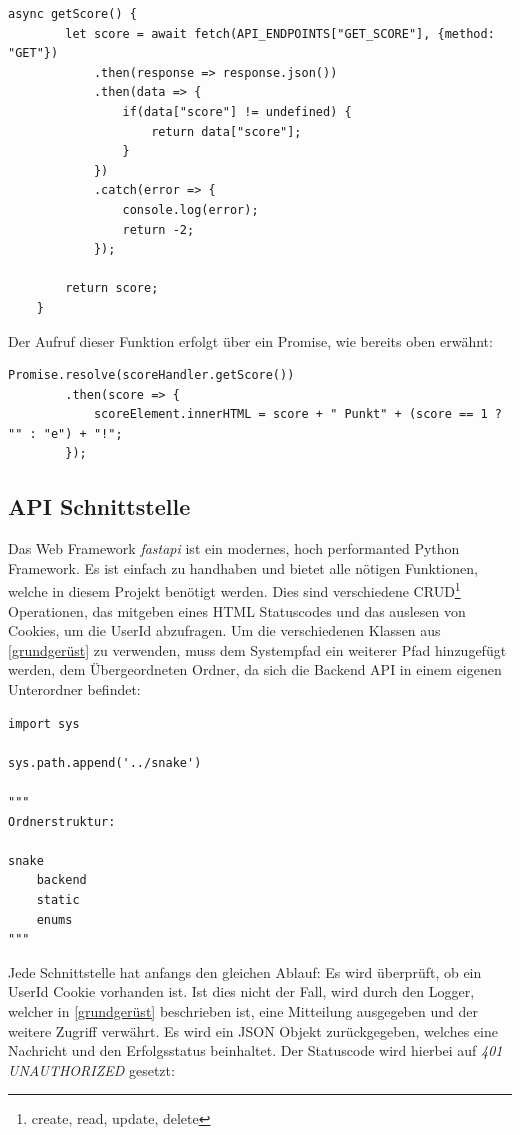 \documentclass[a4paper,12pt]{scrartcl}
\begin{document}
\begin{lstlisting}
async getScore() {
        let score = await fetch(API_ENDPOINTS["GET_SCORE"], {method: "GET"})
            .then(response => response.json())
            .then(data => {
                if(data["score"] != undefined) {
                    return data["score"];
                }
            })
            .catch(error => {
                console.log(error);
                return -2;
            });

        return score;
    }
\end{lstlisting}

Der Aufruf dieser Funktion erfolgt über ein Promise, wie bereits oben erwähnt:

\begin{lstlisting}
Promise.resolve(scoreHandler.getScore())
        .then(score => {
            scoreElement.innerHTML = score + " Punkt" + (score == 1 ? "" : "e") + "!";
        });
\end{lstlisting}


\subsection{API Schnittstelle}

Das Web Framework \textit{fastapi} ist ein modernes, hoch performanted Python Framework. Es ist einfach zu handhaben und bietet alle nötigen Funktionen, welche in diesem Projekt benötigt werden. Dies sind verschiedene CRUD\footnote{create, read, update, delete} Operationen, das mitgeben eines HTML Statuscodes und das auslesen von Cookies, um die UserId abzufragen. Um die verschiedenen Klassen aus \autoref{grundgerüst} zu verwenden, muss dem Systempfad ein weiterer Pfad hinzugefügt werden, dem Übergeordneten Ordner, da sich die Backend API in einem eigenen Unterordner befindet:

\begin{lstlisting}
import sys

sys.path.append('../snake')

"""
Ordnerstruktur:

snake
	backend
	static
	enums
"""
\end{lstlisting}

Jede Schnittstelle hat anfangs den gleichen Ablauf: Es wird überprüft, ob ein UserId Cookie vorhanden ist. Ist dies nicht der Fall, wird durch den Logger, welcher in \autoref{grundgerüst} beschrieben ist, eine Mitteilung ausgegeben und der weitere Zugriff verwährt. Es wird ein JSON Objekt zurückgegeben, welches eine Nachricht und den Erfolgsstatus beinhaltet. Der Statuscode wird hierbei auf \textit{401 UNAUTHORIZED} gesetzt:
\end{document}
